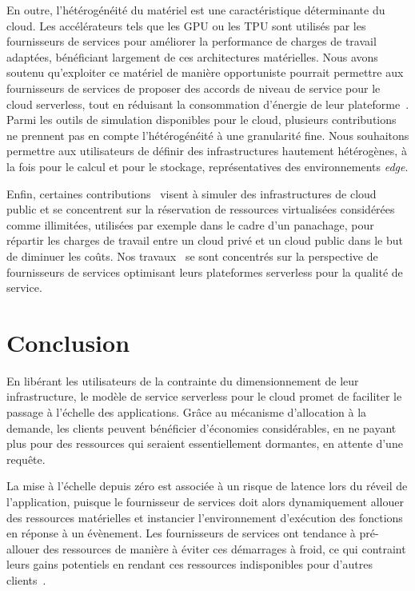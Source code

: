 En outre, l'hétérogénéité du matériel est une caractéristique déterminante du cloud. Les accélérateurs tels que les \gls{GPU} ou les \gls{TPU} sont utilisés par les fournisseurs de services pour améliorer la performance de charges de travail adaptées, bénéficiant largement de ces architectures matérielles. Nous avons soutenu qu'exploiter ce matériel de manière opportuniste pourrait permettre aux fournisseurs de services de proposer des accords de niveau de service pour le cloud serverless, tout en réduisant la consommation d'énergie de leur plateforme~\cite{herofake}.
Parmi les outils de simulation disponibles pour le cloud, plusieurs contributions~\cite{jeonCloudSimExtensionSimulatingDistributed2019, cai_elasticsim_2017, nunez_icancloud_2012, mahmoudiSimFaaSPerformanceSimulator2021} ne prennent pas en compte l'hétérogénéité à une granularité fine. Nous souhaitons permettre aux utilisateurs de définir des infrastructures hautement hétérogènes, à la fois pour le calcul et pour le stockage, représentatives des environnements \textit{edge}.

Enfin, certaines contributions~\cite{nunez_icancloud_2012, mahmoudiSimFaaSPerformanceSimulator2021} visent à simuler des infrastructures de cloud public et se concentrent sur la réservation de ressources virtualisées considérées comme illimitées, utilisées par exemple dans le cadre d'un panachage, pour répartir les charges de travail entre un cloud privé et un cloud public dans le but de diminuer les coûts.
Nos travaux~\cite{herofake, herocache} se sont concentrés sur la perspective de fournisseurs de services optimisant leurs plateformes serverless pour la qualité de service.

\section{Conclusion}

En libérant les utilisateurs de la contrainte du dimensionnement de leur infrastructure, le modèle de service serverless pour le cloud promet de faciliter le passage à l'échelle des applications. Grâce au mécanisme d'allocation à la demande, les clients peuvent bénéficier d'économies considérables, en ne payant plus pour des ressources qui seraient essentiellement dormantes, en attente d'une requête.

La mise à l'échelle depuis zéro est associée à un risque de latence lors du réveil de l'application, puisque le fournisseur de services doit alors dynamiquement allouer des ressources matérielles et instancier l'environnement d'exécution des fonctions en réponse à un évènement. Les fournisseurs de services ont tendance à pré-allouer des ressources de manière à éviter ces démarrages à froid, ce qui contraint leurs gains potentiels en rendant ces ressources indisponibles pour d'autres clients~\cite{tomasImprovingCloudInfrastructure2013}.


